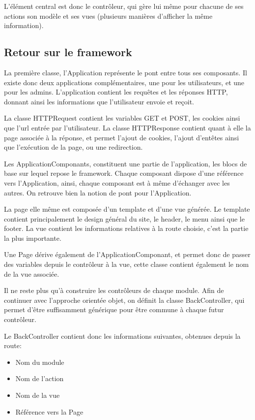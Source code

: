 L'élément central est donc le contrôleur, qui gère lui même pour chacune de ses actions son modèle et ses vues (plusieurs
manières d'afficher la même information).

        \subsection{Retour sur le framework}

La première classe, l'Application représente le pont entre tous ses composants. Il existe donc deux applications complémentaires, une pour les utilisateurs, et une pour les admins.
L'application contient les requêtes et les réponses HTTP, donnant ainsi les informations que l'utilisateur envoie et reçoit.

La classe HTTPRequest contient les variables GET et POST, les cookies ainsi que l'url entrée par l'utilisateur.
La classe HTTPResponse contient quant à elle la page associée à la réponse, et permet l'ajout de cookies, l'ajout d'entêtes
ainsi que l'exécution de la page, ou une redirection.

Les ApplicationComponants, constituent une partie de l'application, les blocs de base sur lequel repose le framework.
Chaque composant dispose d'une référence vers l'Application, ainsi, chaque composant est à même d'échanger avec les autres.
On retrouve bien la notion de pont pour l'Application.

La page elle même est composée d'un template et d'une vue générée.
Le template contient principalement le design général du site, le header, le menu ainsi que le footer.
La vue contient les informations relatives à la route choisie, c'est la partie la plus importante.

Une Page dérive également de l'ApplicationComponant, et permet donc de passer des variables depuis le contrôleur à la vue,
cette classe contient également le nom de la vue associée.

Il ne reste plus qu'à construire les contrôleurs de chaque module.
Afin de continuer avec l'approche orientée objet, on définit la classe BackController, qui permet d'être
suffisamment générique pour être commune à chaque futur contrôleur.

Le BackController contient donc les informations suivantes, obtenues depuis la route:

    \begin{itemize}
    \item Nom du module
    \item Nom de l'action
    \item Nom de la vue
    \item Référence vers la Page
    \end{itemize}

